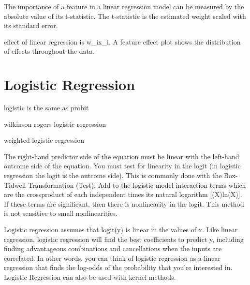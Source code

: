 \documentclass[]{book}
\newenvironment{Shaded}{\begin{snugshade}}{\end{snugshade}}
\newcommand{\DataTypeTok}[1]{\textcolor[rgb]{0.13,0.29,0.53}{#1}}
\newcommand{\KeywordTok}[1]{\textcolor[rgb]{0.13,0.29,0.53}{\textbf{#1}}}
\newcommand{\NormalTok}[1]{#1}
\newcommand{\OperatorTok}[1]{\textcolor[rgb]{0.81,0.36,0.00}{\textbf{#1}}}
\newcommand{\StringTok}[1]{\textcolor[rgb]{0.31,0.60,0.02}{#1}}
\begin{document}
\begin{Shaded}
\end{Shaded}

The importance of a feature in a linear regression model can be measured by the absolute value of
its t-statistic. The t-statistic is the estimated weight scaled with its standard error.

effect of linear regression is w\_ix\_i. A feature effect plot shows the distribution of effects throughout the data.

\hypertarget{logistic-regression}{%
\section{Logistic Regression}\label{logistic-regression}}

logistic is the same as probit

wilkinson rogers logistic regression

weighted logistic regression

The right-hand predictor side of the equation must be linear with the left-hand outcome side of the equation. You must test for linearity in the logit (in logistic regression the logit is the outcome side). This is commonly done with the Box-Tidwell Transformation (Test): Add to the logistic model interaction terms which are the crossproduct of each independent times its natural logarithm {[}(X)ln(X){]}. If these terms are significant, then there is nonlinearity in the logit. This method is not sensitive to small nonlinearities.

Logistic regression assumes that logit(y) is linear in the values of x. Like linear regression, logistic regression will find the best coefficients to predict y, including finding advantageous combinations and cancellations when the inputs are correlated. In other words, you can think of logistic regression as a linear regression that finds the log-odds of the probability that you're interested in. Logistic Regression can also be used with kernel methods.
\end{document}
